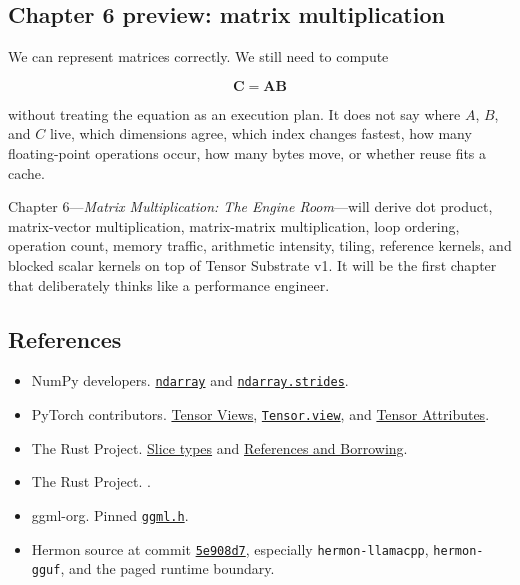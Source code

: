 \documentclass[
  10pt,
]{article}
\providecommand{\tightlist}{%
  \setlength{\itemsep}{0pt}\setlength{\parskip}{0pt}}
\begin{document}
\subsection{Chapter 6 preview: matrix
multiplication}\label{chapter-6-preview-matrix-multiplication}

We can represent matrices correctly. We still need to compute

\[
\mathbf{C}=\mathbf{A}\mathbf{B}
\]

without treating the equation as an execution plan. It does not say
where \(A\), \(B\), and \(C\) live, which dimensions agree, which index
changes fastest, how many floating-point operations occur, how many
bytes move, or whether reuse fits a cache.

Chapter 6---\emph{Matrix Multiplication: The Engine Room}---will derive
dot product, matrix-vector multiplication, matrix-matrix multiplication,
loop ordering, operation count, memory traffic, arithmetic intensity,
tiling, reference kernels, and blocked scalar kernels on top of Tensor
Substrate v1. It will be the first chapter that deliberately thinks like
a performance engineer.

\subsection{References}\label{references-2}

\begin{itemize}
\tightlist
\item
  NumPy developers.
  \href{https://numpy.org/doc/stable/reference/generated/numpy.ndarray.html}{\texttt{ndarray}}
  and
  \href{https://numpy.org/doc/stable/reference/generated/numpy.ndarray.strides.html}{\texttt{ndarray.strides}}.
\item
  PyTorch contributors.
  \href{https://docs.pytorch.org/docs/stable/tensor_view.html}{Tensor
  Views},
  \href{https://docs.pytorch.org/docs/stable/generated/torch.Tensor.view.html}{\texttt{Tensor.view}},
  and
  \href{https://docs.pytorch.org/docs/stable/tensor_attributes.html}{Tensor
  Attributes}.
\item
  The Rust Project.
  \href{https://doc.rust-lang.org/stable/reference/types/slice.html}{Slice
  types} and
  \href{https://doc.rust-lang.org/stable/book/ch04-02-references-and-borrowing.html}{References
  and Borrowing}.
\item
  The Rust Project.
  \href{https://doc.rust-lang.org/std/primitive.usize.html\#method.checked_mul}{\texttt{}}.
\item
  ggml-org. Pinned
  \href{https://github.com/ggml-org/llama.cpp/blob/389ff61d77b5c71cec0cf92fe4e5d01ace80b797/ggml/include/ggml.h}{\texttt{ggml.h}}.
\item
  Hermon source at commit
  \href{https://github.com/hermonai/hermon/commit/5e908d75e4d5ee102f97f6a880ed4d0968d949df}{\texttt{5e908d7}},
  especially \texttt{hermon-llamacpp}, \texttt{hermon-gguf}, and the
  paged runtime boundary.
\end{itemize}
\end{document}
